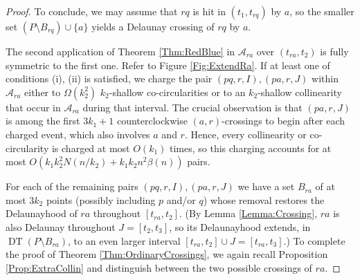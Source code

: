 \documentclass[letter,11pt]{article}
\def\A{\mathcal{A}}
\def\DT{\mathop{\mathrm{DT}}}
\begin{document}
\begin{proof}
To conclude, we may assume that $rq$ is hit in $(t_1,t_{rq})$ by $a$, so the smaller set $(P\setminus B_{rq})\cup\{a\}$ yields a Delaunay crossing of $rq$ by $a$.


\smallskip
\noindent{\bf Charging events in $\A_{ra}$.} The second application of Theorem \ref{Thm:RedBlue} in $\A_{ra}$ over $(t_{ra},t_2)$ is fully symmetric to the first one. Refer to Figure \ref{Fig:ExtendRa}. If at least one of conditions (i), (ii) is satisfied, we charge the pair $(pq,r,I), (pa,r,J)$ within $\A_{ra}$ either to $\Omega(k_2^2)$ $k_2$-shallow co-circularities or to an $k_2$-shallow collinearity that occur in $\A_{ra}$ during that interval. The crucial observation is that $(pa,r,J)$ is among the first $3k_1+1$ counterclockwise $(a,r)$-crossings to begin after each charged event, which also involves $a$ and $r$. Hence, every collinearity or co-circularity is charged at most $O(k_1)$ times, so this charging accounts for at most $O(k_1k_2^2N(n/k_2)+k_1k_2n^2\beta(n))$ pairs.

For each of the remaining pairs $(pq,r,I),(pa,r,J)$ we have a set $B_{ra}$ of at most $3k_2$ points (possibly including $p$ and/or $q$) whose removal restores the Delaunayhood of $ra$ throughout $[t_{ra},t_2]$. (By Lemma \ref{Lemma:Crossing}, $ra$ is also Delaunay throughout $J=[t_2,t_3]$, so its Delaunayhood extends, in $\DT(P\setminus B_{ra})$, to an even larger interval $[t_{ra},t_2]\cup J=[t_{ra},t_{3}]$.)
To complete the proof of Theorem \ref{Thm:OrdinaryCrossings}, we again recall Proposition \ref{Prop:ExtraCollin} and distinguish between the two possible crossings of $ra$.


\end{proof}
\end{document}
